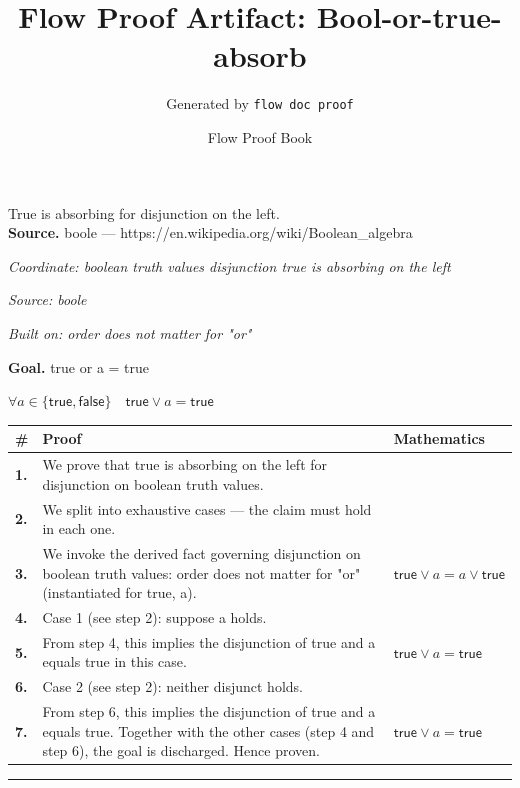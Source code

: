 \documentclass[11pt]{article}
\title{Flow Proof Artifact: Bool-or-true-absorb}
\author{Generated by \texttt{flow doc proof}}
\date{Flow Proof Book}
\theoremstyle{definition}
\begin{document}
\maketitle
True is absorbing for disjunction on the left.\\[0.5em]
\textbf{Source.} boole — https://en.wikipedia.org/wiki/Boolean\_algebra\\[0.5em]
\bigskip
{}\par
\smallskip\noindent\textit{Coordinate: boolean truth values \cdot disjunction \cdot true is absorbing on the left}\par
\smallskip\noindent\textit{Source: boole}\par
\smallskip\noindent\textit{Built on: order does not matter for "or"}\par
\medskip
\noindent\textbf{Goal.} true or a = true\par
\noindent$\displaystyle \forall a \in \{\mathsf{true}, \mathsf{false}\}\quad \mathsf{true} \lor a = \mathsf{true}$\par
\medskip
\noindent
\begin{tabular}{@{} >{\raggedright\arraybackslash}p{} >{\raggedright\arraybackslash}p{} >{\raggedleft\arraybackslash}p{} @{}}
\textbf{\#} & \textbf{Proof} & \textbf{Mathematics} \\
\midrule
\textbf{1.} & We prove that true is absorbing on the left for disjunction on boolean truth values. & \\[0.45em]
\textbf{2.} & We split into exhaustive cases — the claim must hold in each one. & \\[0.45em]
\textbf{3.} & We invoke the derived fact governing disjunction on boolean truth values: order does not matter for "or" (instantiated for true, a). & $\displaystyle \mathsf{true} \lor a = a \lor \mathsf{true}$ \\[0.45em]
\textbf{4.} & Case 1 (see step 2): suppose a holds. & \\[0.45em]
\textbf{5.} & From step 4, this implies the disjunction of true and a equals true in this case. & $\displaystyle \mathsf{true} \lor a = \mathsf{true}$ \\[0.45em]
\textbf{6.} & Case 2 (see step 2): neither disjunct holds. & \\[0.45em]
\textbf{7.} & From step 6, this implies the disjunction of true and a equals true. Together with the other cases (step 4 and step 6), the goal is discharged. Hence proven. & $\displaystyle \mathsf{true} \lor a = \mathsf{true}$ \\[0.45em]
\bottomrule
\end{tabular}
\label{thm:Bool-disjunction-true_is_absorbing_on_the_left}
\par\medskip\hrule
\end{document}
